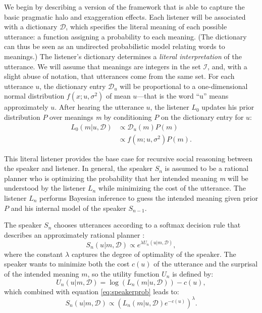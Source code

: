 \documentclass{article} %
\newcommand{\dictionary}{\ensuremath{\mathcal{D}}\xspace}
\begin{document}
We begin by describing a version of the framework that is able to capture the basic pragmatic halo and exaggeration effects.
Each listener will be associated with a dictionary $\dictionary$, which specifies the literal meaning of each possible utterance: a function assigning a probability to each meaning. (The dictionary can thus be seen as an undirected probabilistic model relating words to meanings.) The listener's dictionary determines a \emph{literal interpretation} of the utterance. We will assume that meanings are integers in the set $\mathcal{I}$, and, with a slight abuse of notation, that utterances come from the same set. For each utterance $u$, the dictionary entry $\dictionary_u$ will be proportional to a one-dimensional normal distribution $f(x;u,\sigma^2)$ of mean $u$---that is the word ``u'' means approximately $u$. After hearing the utterance $u$, the listener $L_0$ updates his prior distribution $P$ over meanings \emph{m} by conditioning $P$ on the dictionary entry for $u$:
\begin{align}\label{eq:literallistener}
L_0(m | u, \dictionary) &\propto \dictionary_u(m)P(m) \\
&\propto f(m;u,\sigma^2)P(m).
\end{align}

This literal listener provides the base case for recursive social reasoning between the speaker and listener. In general, the speaker $S_n$ is assumed to be a rational planner who is optimizing the probability that her intended meaning \emph{m} will be understood by the listener $L_n$ while minimizing the cost of the utterance. The listener $L_n$ performs Bayesian inference to guess the intended meaning given prior $P$ and his internal model of the speaker $S_{n-1}$.

The speaker $S_n$ chooses utterances according to a softmax decision rule that describes an approximately rational planner \cite{sutton1998reinforcement}:
\begin{equation}\label{eq:speakerprob}
S_n(u | m,\dictionary) \propto e^{\lambda U_n(u | m,\dictionary)},
\end{equation}
where the constant $\lambda$ captures the degree of optimality of the speaker. 
The speaker wants to minimize both the cost $c(u)$ of the utterance and the surprisal of the intended meaning $m$, so the utility function $U_n$ is defined by:
\begin{equation}\label{eq:speakerutility}
U_n(u | m, \dictionary) = \log (L_{n}(m | u, \dictionary)) - c(u),
\end{equation}
which combined with equation \ref{eq:speakerprob} leads to:
\begin{equation}\label{eq:speakersimplified}
S_n(u | m, \dictionary) \propto (L_{n}(m | u,\dictionary)e^{-c(u)}) ^\lambda.
\end{equation}
\end{document}
